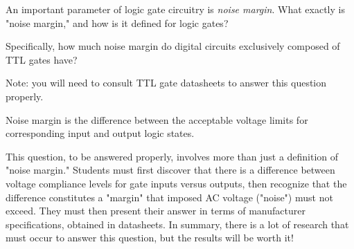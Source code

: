 

An important parameter of logic gate circuitry is {\it noise margin}.  What exactly is "noise margin," and how is it defined for logic gates?

Specifically, how much noise margin do digital circuits exclusively composed of TTL gates have?

\vskip 10pt

Note: you will need to consult TTL gate datasheets to answer this question properly.







Noise margin is the difference between the acceptable voltage limits for corresponding input and output logic states.







This question, to be answered properly, involves more than just a definition of "noise margin."  Students must first discover that there is a difference between voltage compliance levels for gate inputs versus outputs, then recognize that the difference constitutes a "margin" that imposed AC voltage ("noise") must not exceed.  They must then present their answer in terms of manufacturer specifications, obtained in datasheets.  In summary, there is a lot of research that must occur to answer this question, but the results will be worth it!




